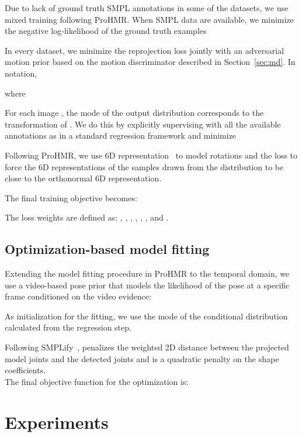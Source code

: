 \documentclass[runningheads]{llncs}
\begin{document}
Due to lack of ground truth SMPL annotations in some of the datasets, we use mixed training following ProHMR. When SMPL data are available, we minimize the negative log-likelihood of the ground truth examples 

In every dataset, we minimize the reprojection loss jointly with an adversarial motion prior based on the motion discriminator described in Section~\ref{sec:md}. In notation, 

where



\noindent For each image , the mode 
of the output distribution corresponds to the transformation of . We do this by explicitly supervising 
with all the available annotations as in a standard regression framework and minimize

 
 Following ProHMR, we use 6D representation~\cite{Zhou_2019_CVPR} to model rotations and the  loss to force the 6D representations of the samples drawn from the distribution to be close
to the orthonormal 6D representation.

 The final training objective becomes:

The loss weights are defined as: 
, , , , ,
,  and .
\subsection{Optimization-based model fitting}

Extending the model fitting procedure in ProHMR to the temporal domain, we use a video-based pose prior that models the likelihood of the pose at a specific frame conditioned on the video evidence:
 
As initialization for the fitting, we use the mode  of the conditional distribution calculated from the regression step.

Following SMPLify~\cite{Bogo:ECCV:2016},  penalizes the weighted 2D distance between the projected model joints and the detected joints and  is a quadratic penalty on the shape coefficients. \\

\noindent The final objective function for the optimization is:


\section{Experiments}
\end{document}
